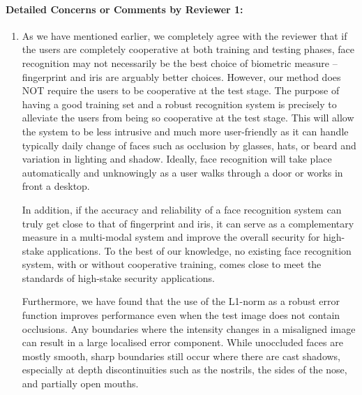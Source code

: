 \documentclass[11pt]{article}
\begin{document}
\paragraph{Detailed Concerns or Comments by Reviewer 1:}
\begin{enumerate}
\item As we have mentioned earlier, we completely agree with the reviewer that if the users are completely cooperative at
both training and testing phases, face recognition may not necessarily be the best choice of biometric measure -- fingerprint
and iris are arguably better choices. However, our method does NOT require the users to be cooperative at the test
stage. The purpose of having a good training set and a robust recognition system is precisely to alleviate the users 
from being so cooperative at the test stage. This will allow the system to be less intrusive and much more user-friendly 
as it can handle typically daily change of faces such as occlusion by glasses, hats, or beard and variation in lighting and shadow. Ideally, face recognition will take place automatically and unknowingly as a user walks through a door or works in front a desktop.

In addition, if the accuracy and reliability of a face recognition system can truly get close to that of fingerprint and iris, it can serve as a complementary measure in a multi-modal system and improve the overall security for high-stake applications. To the best of our knowledge, no existing face recognition system, with or without cooperative training, comes close to meet the standards of high-stake security applications. 

Furthermore, we have found that the use of the L1-norm as a robust error function improves performance 
even when the test image does not contain occlusions.  Any boundaries where the intensity changes in a
misaligned image can result in a large localised error component.  While
unoccluded faces are mostly smooth, sharp boundaries still occur where there
are cast shadows, especially at depth discontinuities such as the nostrils, the
sides of the nose, and partially open mouths.  



\end{enumerate}
\end{document}
